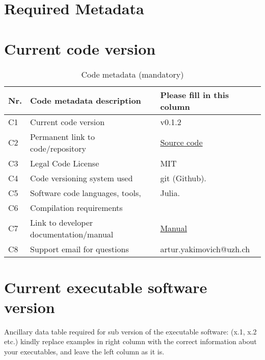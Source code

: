 \section{Required Metadata}
\label{}

\section{Current code version}
\label{}

\begin{table}
\begin{tabular}{lll}
\hline
\textbf{Nr.} & \textbf{Code metadata description} & \textbf{Please fill in this column} \\
\hline
C1 & Current code version & v0.1.2 \\
\hline
C2 & Permanent link to code/repository & \href{https://github.com/MatlabCompat/MatlabCompat.jl}{Source code} \\
\hline
C3 & Legal Code License   & MIT \\
\hline
C4 & Code versioning system used & git (Github). \\
\hline
C5 & Software code languages, tools, & Julia. \\
\hline
C6 & Compilation requirements & \\
\hline
C7 & Link to developer documentation/manual & \href{http://matlabcompat.github.io/help.html}{Manual}\\
\hline
C8 & Support email for questions & artur.yakimovich@uzh.ch\\
\hline
\end{tabular}
\caption{Code metadata (mandatory)}
\end{table}

\section{Current executable software version}
\label{}

Ancillary data table required for sub version of the executable software: (x.1, x.2 etc.) kindly replace examples in right column with the correct information about your executables, and leave the left column as it is.

